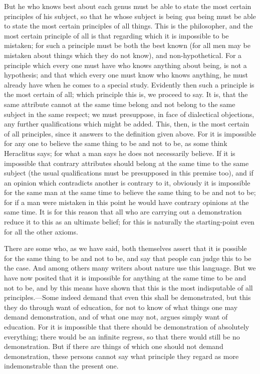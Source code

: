 But he who knows best about each genus must be able to state the most certain principles of his subject, so that he whose subject is being \emph{qua} being must be able to state the most certain principles of all things. This is the philosopher, and the most certain principle of all is that regarding which it is impossible to be mistaken; for such a principle must be both the best known (for all men may be mistaken about things which they do not know), and non-hypothetical. For a principle which every one must have who knows anything about being, is not a hypothesis; and that which every one must know who knows anything, he must already have when he comes to a special study. Evidently then such a principle is the most certain of all; which principle this is, we proceed to say. It is, that the same attribute cannot at the same time belong and not belong to the same subject in the same respect; we must presuppose, in face of dialectical objections, any further qualifications which might be added. This, then, is the most certain of all principles, since it answers to the definition given above. For it is impossible for any one to believe the same thing to be and not to be, as some think Heraclitus says; for what a man says he does not necessarily believe. If it is impossible that contrary attributes should belong at the same time to the same subject (the usual qualifications must be presupposed in this premise too), and if an opinion which contradicts another is contrary to it, obviously it is impossible for the same man at the same time to believe the same thing to be and not to be; for if a man were mistaken in this point he would have contrary opinions at the same time. It is for this reason that all who are carrying out a demonstration reduce it to this as an ultimate belief; for this is naturally the starting-point even for all the other axioms.


There are some who, as we have said, both themselves assert that it is possible for the same thing to be and not to be, and say that people can judge this to be the case. And among others many writers about nature use this language. But we have now posited that it is impossible for anything at the same time to be and not to be, and by this means have shown that this is the most indisputable of all principles.—Some indeed demand that even this shall be demonstrated, but this they do through want of education, for not to know of what things one may demand demonstration, and of what one may not, argues simply want of education. For it is impossible that there should be demonstration of absolutely everything; there would be an infinite regress, so that there would still be no demonstration. But if there are things of which one should not demand demonstration, these persons cannot say what principle they regard as more indemonstrable than the present one.

